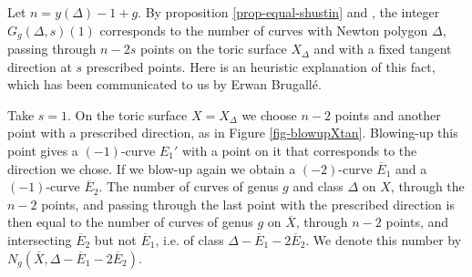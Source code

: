 \begin{rema}
Let $n = y(\Delta)-1+g$. By proposition \ref{prop-equal-shustin} and \cite[Corollary 5.11]{shustin-2024-refined}, the integer $G_g(\Delta,s)(1)$ corresponds to the number of curves with Newton polygon $\Delta$, passing through $n-2s$ points on the toric surface $X_\Delta$ and with a fixed tangent direction at $s$ prescribed points. 
Here is an heuristic explanation of this fact, which has been communicated to us by Erwan Brugallé.

Take $s=1$. On the toric surface $X=X_\Delta$ we choose $n-2$ points and another point with a prescribed direction, as in Figure \ref{fig-blowupXtan}. Blowing-up this point gives a $(-1)$-curve $E_1'$ with a point on it that corresponds to the direction we chose. If we blow-up again we obtain a $(-2)$-curve $\overline E_1$ and a $(-1)$-curve $\overline E_2$. The number of curves of genus $g$ and class $\Delta$ on $X$, through the $n-2$ points, and passing through the last point with the prescribed direction is then equal to the number of curves  of genus $g$ on $\overline X$, through $n-2$ points, and intersecting $\overline E_2$ but not $\overline E_1$, i.e.  of class $\Delta-\overline E_1 - 2\overline E_2$. We denote this number by $N_g(\overline X,\Delta- \overline E_1 - 2\overline E_2)$.

\begin{figure}[ht]
	\centering
{}
\end{figure}
\end{rema}
